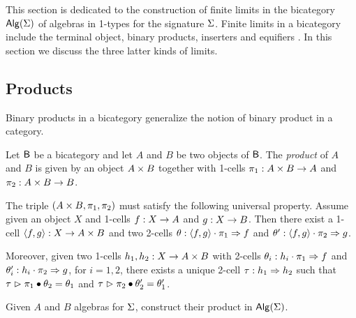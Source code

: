 This section is dedicated to the construction of finite limits in the
bicategory $\mathsf{Alg}(\Sigma)$ of algebras in 1-types for the signature
$\Sigma$.  Finite limits in a bicategory include the terminal object,
binary products, inserters and equifiers
\cite{power1991characterization}. In this section we discuss the three
latter kinds of limits.

\subsection{Products}

Binary products in a bicategory generalize the notion of binary
product in a category.

\begin{definition}\label{def:product}
Let $\mathsf{B}$ be a bicategory and let $A$ and $B$ be two objects of
$\mathsf{B}$. The \emph{product} of $A$ and $B$ is given by an object $A \times B$ together with 1-cells $\pi_1 : A \times B \rightarrow A$ and
$\pi_2 : A \times B \rightarrow B$.

The triple $(A \times B,\pi_1, \pi_2)$ must satisfy the following
universal property. Assume given an object $X$ and 1-cells $f : X
\rightarrow A$ and $g : X \rightarrow B$. Then there exist a 1-cell
$\langle f , g \rangle : X \rightarrow A \times B$ and two 2-cells $\theta :
\langle f , g \rangle \cdot \pi_1 \Rightarrow f$ and $\theta' : \langle f , g \rangle
\cdot \pi_2 \Rightarrow g$.

Moreover, given two 1-cells $h_1,h_2 : X \rightarrow A \times B$ with
2-cells $\theta_i : h_i \cdot \pi_1 \Rightarrow f$ and $\theta'_i : h_i
\cdot \pi_2 \Rightarrow g$, for $i= 1,2$, there exists a unique
2-cell $\tau : h_1 \Rightarrow h_2$ such that $\tau \vartriangleright
\pi_1 \bullet \theta_2 = \theta_1$ and $\tau \vartriangleright \pi_2 \bullet
\theta'_2 = \theta'_1$.
\end{definition} 

\begin{problem}
\label{prob:product}
Given $A$ and $B$ algebras for $\Sigma$, construct their product in
$\mathsf{Alg}(\Sigma)$.
\end{problem}

